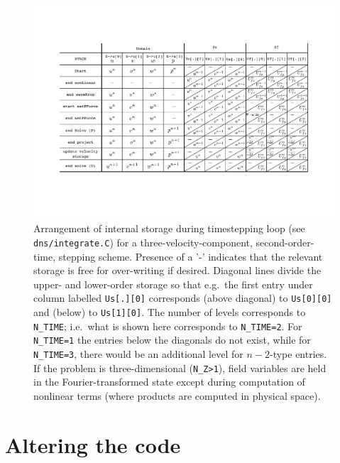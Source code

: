 \documentclass[11pt]{report}
\begin{document}
\begin{figure}
\begin{center}
\includegraphics[viewport=72 130 770 492,width=\textwidth,clip=true]
{timeSchemeStorage}
\end{center}
\caption{Arrangement of internal storage during timestepping loop (see
  \texttt{dns/integrate.C}) for a three-velocity-component,
  second-order-time, stepping scheme. Presence of a '-' indicates that
  the relevant storage is free for over-writing if desired.  Diagonal
  lines divide the upper- and lower-order storage so that e.g.\ the
  first entry under column labelled \texttt{Us[.][0]} corresponds
  (above diagonal) to \texttt{Us[0][0]} and (below) to
  \texttt{Us[1][0]}.
%
  The number of levels corresponds to
  \texttt{N\_TIME}; i.e.\ what is shown here corresponds to
  \texttt{N\_TIME=2}.  For \texttt{N\_TIME=1} the entries below the
  diagonals do not exist, while for \texttt{N\_TIME=3}, there would be
  an additional level for $n-2$-type entries.
%
  If the problem is three-dimensional (\texttt{N\_Z>1}), field
  variables are held in the Fourier-transformed state except during
  computation of nonlinear terms (where products are computed in
  physical space). }
\label{fig.storage}
\end{figure}



\section{Altering the code}
\label{sec.alt}
\end{document}
